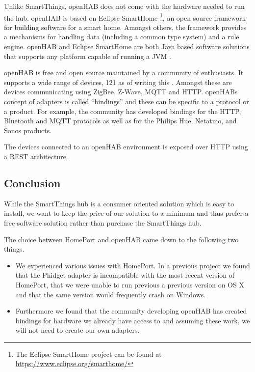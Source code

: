 Unlike SmartThings, openHAB \cite{OPENHAB} does not come with the hardware needed to run the hub.
openHAB is based on Eclipse SmartHome \footnote{The Eclipse SmartHome project can be found at \url{https://www.eclipse.org/smarthome/}}, an open source framework for building software for a smart home. Amongst others, the framework provides a mechanisms for handling data (including a common type system) and a rule engine.
openHAB and Eclipse SmartHome are both Java based software solutions that supports any platform capable of running a JVM \cite{openhab:introduction}.

openHAB is free and open source maintained by a community of enthusiasts. It supports a wide range of devices, 121 as of writing this \cite{openhab:supported-technologies}. Amongst these are devices communicating using ZigBee, Z-Wave, MQTT and HTTP. openHABs concept of adapters is called ``bindings'' and these can be specific to a protocol or a product. For example, the community has developed bindings for the HTTP, Bluetooth and MQTT protocols as well as for the Philips Hue, Netatmo, and Sonos products.

The devices connected to an openHAB environment is exposed over HTTP using a REST architecture.

\subsection{Conclusion}
\label{sec:analysis:choice-of-hub:conclusion}

While the SmartThings hub is a consumer oriented solution which is easy to install, we want to keep the price of our solution to a minimum and thus prefer a free software solution rather than purchase the SmartThings hub.

The choice between HomePort and openHAB came down to the following two things.

\begin{itemize}
\item We experienced various issues with HomePort. In a previous project \cite{prespecialisation} we found that the Phidget adapter is incompatible with the most recent version of HomePort, that we were unable to run previous a previous version on OS X and that the same version would frequently crash on Windows.
\item Furthermore we found that the community developing openHAB has created bindings for hardware we already have access to and assuming these work, we will not need to create our own adapters.
\end{itemize}

